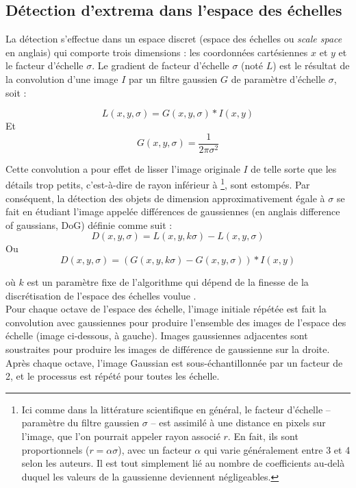 \subsection{Détection d'extrema dans l'espace des échelles}
La détection s'effectue dans un espace discret (espace des échelles ou \textit{scale space} en anglais) qui comporte trois dimensions : les coordonnées cartésiennes $x$ et $y$ et le facteur d'échelle $\sigma$. Le gradient de facteur d'échelle $\sigma$ (noté $L$) est le résultat de la convolution d'une image $I$ par un filtre gaussien $G$ de paramètre d'échelle $\sigma$, soit \cite{low04} :

\begin{equation}
L \left( x, y, \sigma \right) = G \left( x, y, \sigma \right) * I \left( x, y \right)
\end{equation}
Et
\[
G \left( x, y, \sigma \right) = \frac{1}{2\pi\sigma^2}
\]

Cette convolution a pour effet de lisser l'image originale $I$ de telle sorte que les détails trop petits, c'est-à-dire de rayon inférieur à \footnote{ Ici comme dans la littérature scientifique en général, le facteur d'échelle – paramètre du filtre gaussien $\sigma$ – est assimilé à une distance en pixels sur l'image, que l'on pourrait appeler rayon associé $r$. En fait, ils sont proportionnels ($r = \alpha \sigma$), avec un facteur $\alpha$ qui varie généralement entre 3 et 4 selon les auteurs. Il est tout simplement lié au nombre de coefficients au-delà duquel les valeurs de la gaussienne deviennent négligeables.}, sont estompés. Par conséquent, la détection des objets de dimension approximativement égale à $\sigma$ se fait en étudiant l'image appelée différences de gaussiennes (en anglais difference of gaussians, DoG) définie comme suit :
\begin{equation}
D \left( x, y, \sigma \right) = L \left( x, y, k\sigma \right) - L \left( x, y, \sigma \right)
\end{equation}
Ou
\[
D \left( x, y, \sigma \right) = (G \left( x, y, k\sigma \right) - G \left( x, y, \sigma \right)) * I \left( x, y \right)
\]

où $k$ est un paramètre fixe de l'algorithme qui dépend de la finesse de la discrétisation de l'espace des échelles voulue \cite{low04}.\\

Pour chaque octave de l'espace des échelle, l'image initiale répétée est fait la convolution avec gaussiennes pour produire l'ensemble des images de l'espace des échelle (image ci-dessous, à gauche). Images gaussiennes adjacentes sont soustraites
pour produire les images de différence de gaussienne sur la droite. Après chaque octave, l'image Gaussian est sous-échantillonnée par un facteur de 2, et le processus est répété pour toutes les échelle.

